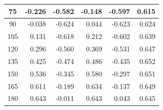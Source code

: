 \begin{table}[htbp]
\begin{center}
\begin{tabular}{|p{20mm}|p{20mm}|p{20mm}|p{20mm}|p{20mm}|p{20mm}|}
            \multicolumn{1}{|c|}{75}                      & \multicolumn{1}{|r|}{-0.226}                        & \multicolumn{1}{|r|}{-0.582}                  & \multicolumn{1}{|r|}{-0.148}                    & \multicolumn{1}{|r|}{-0.597}                  & \multicolumn{1}{|r|}{0.615}                         \\ \hline
            \multicolumn{1}{|c|}{90}                      & \multicolumn{1}{|r|}{-0.038}                        & \multicolumn{1}{|r|}{-0.624}                  & \multicolumn{1}{|r|}{0.044}                     & \multicolumn{1}{|r|}{-0.623}                  & \multicolumn{1}{|r|}{0.624}                         \\ \hline
            \multicolumn{1}{|c|}{105}                     & \multicolumn{1}{|r|}{0.131}                         & \multicolumn{1}{|r|}{-0.618}                  & \multicolumn{1}{|r|}{0.212}                     & \multicolumn{1}{|r|}{-0.602}                  & \multicolumn{1}{|r|}{0.639}                         \\ \hline
            \multicolumn{1}{|c|}{120}                     & \multicolumn{1}{|r|}{0.296}                         & \multicolumn{1}{|r|}{-0.560}                  & \multicolumn{1}{|r|}{0.369}                     & \multicolumn{1}{|r|}{-0.531}                  & \multicolumn{1}{|r|}{0.647}                         \\ \hline
            \multicolumn{1}{|c|}{135}                     & \multicolumn{1}{|r|}{0.425}                         & \multicolumn{1}{|r|}{-0.474}                  & \multicolumn{1}{|r|}{0.486}                     & \multicolumn{1}{|r|}{-0.435}                  & \multicolumn{1}{|r|}{0.652}                         \\ \hline
            \multicolumn{1}{|c|}{150}                     & \multicolumn{1}{|r|}{0.536}                         & \multicolumn{1}{|r|}{-0.345}                  & \multicolumn{1}{|r|}{0.580}                     & \multicolumn{1}{|r|}{-0.297}                  & \multicolumn{1}{|r|}{0.651}                         \\ \hline
            \multicolumn{1}{|c|}{165}                     & \multicolumn{1}{|r|}{0.611}                         & \multicolumn{1}{|r|}{-0.189}                  & \multicolumn{1}{|r|}{0.634}                     & \multicolumn{1}{|r|}{-0.137}                  & \multicolumn{1}{|r|}{0.649}                         \\ \hline
            \multicolumn{1}{|c|}{180}                     & \multicolumn{1}{|r|}{0.643}                         & \multicolumn{1}{|r|}{-0.011}                  & \multicolumn{1}{|r|}{0.643}                     & \multicolumn{1}{|r|}{0.043}                   & \multicolumn{1}{|r|}{0.645}                         \\ \hline

\end{tabular}
\end{center}
\end{table}

